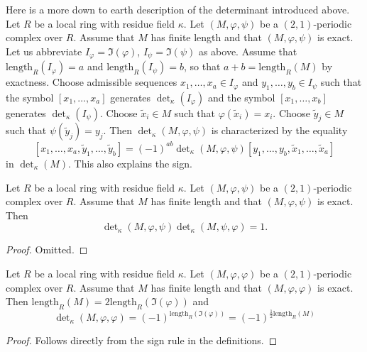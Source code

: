 \begin{remark}
\label{remark-more-elementary}
Here is a more down to earth description of the determinant
introduced above. Let $R$ be a local ring with residue field $\kappa$.
Let $(M, \varphi, \psi)$ be a $(2, 1)$-periodic complex over $R$.
Assume that $M$ has finite length and that $(M, \varphi, \psi)$ is
exact. Let us abbreviate $I_\varphi = \Im(\varphi)$,
$I_\psi = \Im(\psi)$ as above.
Assume that $\text{length}_R(I_\varphi) = a$ and
$\text{length}_R(I_\psi) = b$, so that $a + b = \text{length}_R(M)$
by exactness. Choose admissible sequences
$x_1, \ldots, x_a \in I_\varphi$ and $y_1, \ldots, y_b \in I_\psi$
such that the symbol $[x_1, \ldots, x_a]$ generates $\det_\kappa(I_\varphi)$
and the symbol $[x_1, \ldots, x_b]$ generates $\det_\kappa(I_\psi)$.
Choose $\tilde x_i \in M$ such that $\varphi(\tilde x_i) = x_i$.
Choose $\tilde y_j \in M$ such that $\psi(\tilde y_j) = y_j$.
Then $\det_\kappa(M, \varphi, \psi)$ is characterized
by the equality
$$
[x_1, \ldots, x_a, \tilde y_1, \ldots, \tilde y_b]
=
(-1)^{ab} \det\nolimits_\kappa(M, \varphi, \psi)
[y_1, \ldots, y_b, \tilde x_1, \ldots, \tilde x_a]
$$
in $\det_\kappa(M)$. This also explains the sign.
\end{remark}

\begin{lemma}
\label{lemma-periodic-determinant-shift}
Let $R$ be a local ring with residue field $\kappa$.
Let $(M, \varphi, \psi)$ be a $(2, 1)$-periodic complex over $R$.
Assume that $M$ has finite length and that $(M, \varphi, \psi)$ is
exact. Then
$$
\det\nolimits_\kappa(M, \varphi, \psi)
\det\nolimits_\kappa(M, \psi, \varphi)
= 1.
$$
\end{lemma}

\begin{proof}
Omitted.
\end{proof}

\begin{lemma}
\label{lemma-periodic-determinant-sign}
Let $R$ be a local ring with residue field $\kappa$.
Let $(M, \varphi, \varphi)$ be a $(2, 1)$-periodic complex over $R$.
Assume that $M$ has finite length and that $(M, \varphi, \varphi)$ is
exact. Then $\text{length}_R(M) = 2 \text{length}_R(\Im(\varphi))$
and
$$
\det\nolimits_\kappa(M, \varphi, \varphi)
=
(-1)^{\text{length}_R(\Im(\varphi))}
=
(-1)^{\frac{1}{2}\text{length}_R(M)}
$$
\end{lemma}

\begin{proof}
Follows directly from the sign rule in the definitions.
\end{proof}

